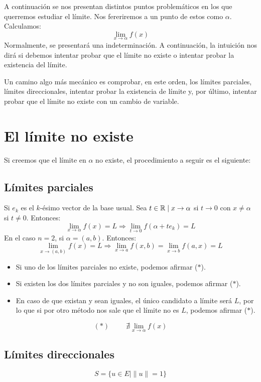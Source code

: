 A continuación se nos presentan distintos puntos problemáticos en los que querremos
estudiar el límite. Nos fereriremos a un punto de estos como $\alpha$.
Calculamos:
$$\lim_{x \to \alpha} f(x)$$
Normalmente, se presentará una indeterminación. A continuación, la intuición nos dirá
si debemos intentar probar que el límite no existe o intentar probar la existencia del límite.


Un camino algo más mecánico es comprobar, en este orden, los límites parciales, límites direccionales,
intentar probar la existencia de límite y, por último, intentar probar que el límite no
existe con un cambio de variable.

\section{El límite no existe}

Si creemos que el límite en $\alpha$ no existe, el procedimiento a seguir es el siguiente:

\subsection{Límites parciales}

Si $e_k$ es el $k$-ésimo vector de la base usual. Sea $t \in \mathbb R \mid x \rightarrow \alpha$ si
$t \rightarrow 0$ con $x \neq \alpha$ si $t \neq 0$. Entonces:
$$\lim_{x \to \alpha}f(x) = L \Rightarrow \lim_{t \to 0}f(\alpha + te_k)=L$$
En el caso $n=2$, si $\alpha = (a,b)$. Entonces:
$$\lim_{x \to (a,b)}f(x) = L \Rightarrow \lim_{x \rightarrow a}f(x,b) = \lim_{x \rightarrow b}f(a,x)=L$$

\begin{itemize}
    \item Si uno de los límites parciales no existe, podemos afirmar ($\ast$).
    \item Si existen los dos límites parciales y no son iguales, podemos afirmar ($\ast$).
    \item En caso de que existan y sean iguales, el único candidato a límite será $L$, por lo que si por
          otro método nos sale que el límite no es $L$, podemos afirmar ($\ast$).
\end{itemize}
$$(\ast)\hspace{1cm}\nexists \lim_{x \to \alpha}f(x)$$

\subsection{Límites direccionales}
$$S = \{u \in E \mid \|u\| = 1\}$$


